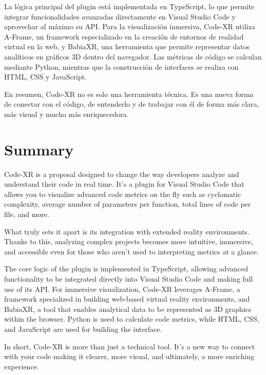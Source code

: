 \documentclass[a4paper, 12pt]{book}
\begin{document}
La lógica principal del plugin está implementada en TypeScript, lo que permite integrar funcionalidades avanzadas directamente en Visual Studio Code y aprovechar al máximo su API. Para la visualización inmersiva, Code‑XR utiliza A-Frame, un framework especializado en la creación de entornos de realidad virtual en la web, y BabiaXR, una herramienta que permite representar datos analíticos en gráficos 3D dentro del navegador. Las métricas de código se calculan mediante Python, mientras que la construcción de interfaces se realiza con HTML, CSS y JavaScript.


En resumen, Code‑XR no es solo una herramienta técnica. Es una nueva forma de conectar con el código, de entenderlo y de trabajar con él de forma más clara, más visual y mucho más enriquecedora.




\chapter*{Summary}

Code‑XR is a proposal designed to change the way developers analyze and understand their code in real time. It’s a plugin for Visual Studio Code that allows you to visualize advanced code metrics on the fly such as cyclomatic complexity, average number of parameters per function, total lines of code per file, and more.

What truly sets it apart is its integration with extended reality environments. Thanks to this, analyzing complex projects becomes more intuitive, immersive, and accessible even for those who aren't used to interpreting metrics at a glance.

The core logic of the plugin is implemented in TypeScript, allowing advanced functionality to be integrated directly into Visual Studio Code and making full use of its API. For immersive visualization, Code‑XR leverages A-Frame, a framework specialized in building web-based virtual reality environments, and BabiaXR, a tool that enables analytical data to be represented as 3D graphics within the browser. Python is used to calculate code metrics, while HTML, CSS, and JavaScript are used for building the interface.

In short, Code‑XR is more than just a technical tool. It's a new way to connect with your code making it clearer, more visual, and ultimately, a more enriching experience.
\end{document}
